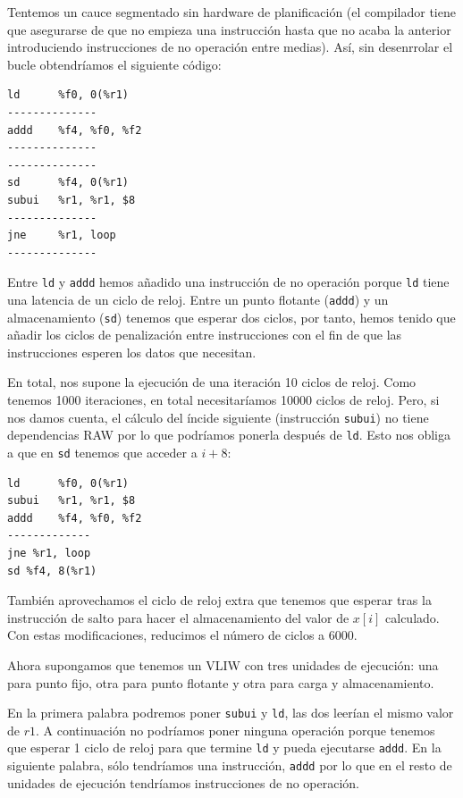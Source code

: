\documentclass[10pt,a4paper,spanish]{report}
\begin{document}
Tentemos un cauce segmentado sin hardware de planificación (el compilador tiene que asegurarse de que no empieza una instrucción hasta que no acaba la anterior introduciendo instrucciones de no operación entre medias). Así, sin desenrrolar el bucle obtendríamos el siguiente código:

\begin{verbatim}
ld      %f0, 0(%r1)
--------------
addd    %f4, %f0, %f2
--------------
--------------
sd      %f4, 0(%r1)
subui   %r1, %r1, $8
--------------
jne     %r1, loop
--------------
\end{verbatim}

Entre \verb*|ld| y \verb*|addd| hemos añadido una instrucción de no operación porque \verb*|ld| tiene una latencia de un ciclo de reloj. Entre un punto flotante (\verb*|addd|) y un almacenamiento (\verb*|sd|) tenemos que esperar dos ciclos, por tanto, hemos tenido que añadir los ciclos de penalización entre instrucciones con el fin de que las instrucciones esperen los datos que necesitan.

En total, nos supone la ejecución de una iteración 10 ciclos de reloj. Como tenemos 1000 iteraciones, en total necesitaríamos 10000 ciclos de reloj. Pero, si nos damos cuenta, el cálculo del íncide siguiente (instrucción \verb*|subui|) no tiene dependencias RAW por lo que podríamos ponerla después de \verb*|ld|. Esto nos obliga a que en \verb*|sd| tenemos que acceder a $i+8$:

\begin{verbatim}
ld      %f0, 0(%r1)
subui   %r1, %r1, $8
addd    %f4, %f0, %f2
-------------
jne %r1, loop
sd %f4, 8(%r1)
\end{verbatim}

También aprovechamos el ciclo de reloj extra que tenemos que esperar tras la instrucción de salto para hacer el almacenamiento del valor de $x[i]$ calculado. Con estas modificaciones, reducimos el número de ciclos a 6000.

Ahora supongamos que tenemos un VLIW con tres unidades de ejecución: una para punto fijo, otra para punto flotante y otra para carga y almacenamiento. 

En la primera palabra podremos poner \verb*|subui| y \verb*|ld|, las dos leerían el mismo valor de $r1$. A continuación no podríamos poner ninguna operación porque tenemos que esperar 1 ciclo de reloj para que termine \verb*|ld| y pueda ejecutarse \verb*|addd|. En la siguiente palabra, sólo tendríamos una instrucción, \verb*|addd| por lo que en el resto de unidades de ejecución tendríamos instrucciones de no operación.
\end{document}
